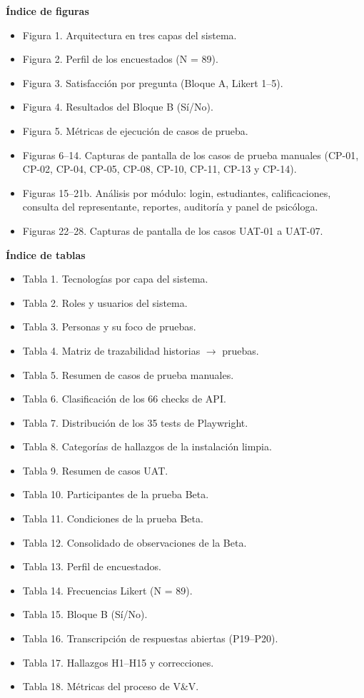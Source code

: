 \documentclass[11pt,a4paper]{article}
\begin{document}
\textbf{Índice de figuras}


\begin{itemize}[leftmargin=*]
\item Figura 1. Arquitectura en tres capas del sistema.
\item Figura 2. Perfil de los encuestados (N = 89).
\item Figura 3. Satisfacción por pregunta (Bloque A, Likert 1--5).
\item Figura 4. Resultados del Bloque B (Sí/No).
\item Figura 5. Métricas de ejecución de casos de prueba.
\item Figuras 6--14. Capturas de pantalla de los casos de prueba manuales (CP-01, CP-02, CP-04, CP-05, CP-08, CP-10, CP-11, CP-13 y CP-14).
\item Figuras 15--21b. Análisis por módulo: login, estudiantes, calificaciones, consulta del representante, reportes, auditoría y panel de psicóloga.
\item Figuras 22--28. Capturas de pantalla de los casos UAT-01 a UAT-07.
\end{itemize}


\textbf{Índice de tablas}


\begin{itemize}[leftmargin=*]
\item Tabla 1. Tecnologías por capa del sistema.
\item Tabla 2. Roles y usuarios del sistema.
\item Tabla 3. Personas y su foco de pruebas.
\item Tabla 4. Matriz de trazabilidad historias {$\rightarrow$} pruebas.
\item Tabla 5. Resumen de casos de prueba manuales.
\item Tabla 6. Clasificación de los 66 checks de API.
\item Tabla 7. Distribución de los 35 tests de Playwright.
\item Tabla 8. Categorías de hallazgos de la instalación limpia.
\item Tabla 9. Resumen de casos UAT.
\item Tabla 10. Participantes de la prueba Beta.
\item Tabla 11. Condiciones de la prueba Beta.
\item Tabla 12. Consolidado de observaciones de la Beta.
\item Tabla 13. Perfil de encuestados.
\item Tabla 14. Frecuencias Likert (N = 89).
\item Tabla 15. Bloque B (Sí/No).
\item Tabla 16. Transcripción de respuestas abiertas (P19--P20).
\item Tabla 17. Hallazgos H1--H15 y correcciones.
\item Tabla 18. Métricas del proceso de V\&V.
\end{itemize}
\end{document}
